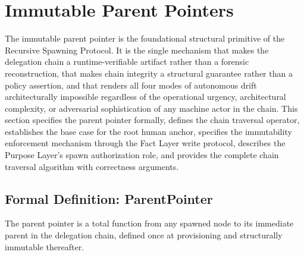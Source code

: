 \section{Immutable Parent Pointers}
\label{sec:immutable-parent-pointers}

The immutable parent pointer is the foundational structural primitive of the Recursive Spawning Protocol. It is the single mechanism that makes the delegation chain a runtime-verifiable artifact rather than a forensic reconstruction, that makes chain integrity a structural guarantee rather than a policy assertion, and that renders all four modes of autonomous drift architecturally impossible regardless of the operational urgency, architectural complexity, or adversarial sophistication of any machine actor in the chain. This section specifies the parent pointer formally, defines the chain traversal operator, establishes the base case for the root human anchor, specifies the immutability enforcement mechanism through the Fact Layer write protocol, describes the Purpose Layer's spawn authorization role, and provides the complete chain traversal algorithm with correctness arguments.

\subsection{Formal Definition: ParentPointer}
\label{sec:parent-pointer-definition}

The parent pointer is a total function from any spawned node to its immediate parent in the delegation chain, defined once at provisioning and structurally immutable thereafter.

